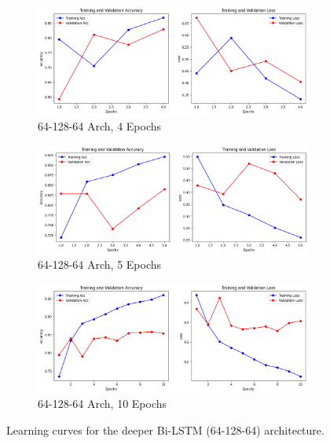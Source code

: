 \documentclass[11pt]{article}
\begin{document}
\begin{figure}[htbp]
  \centering
  \begin{subfigure}{0.3\textwidth}
    \includegraphics[width=\linewidth]{figs/4_3.png}
    \caption{64-128-64 Arch, 4 Epochs}
    \label{fig:lstm-64-128-64-4e}
  \end{subfigure}
  \hfill
  \begin{subfigure}{0.3\textwidth}
    \includegraphics[width=\linewidth]{figs/5_3.png}
    \caption{64-128-64 Arch, 5 Epochs}
    \label{fig:lstm-64-128-64-5e}
  \end{subfigure}
  \hfill
  \begin{subfigure}{0.3\textwidth}
    \includegraphics[width=\linewidth]{figs/10_3.png}
    \caption{64-128-64 Arch, 10 Epochs}
    \label{fig:lstm-64-128-64-10e}
  \end{subfigure}
 
  \caption{Learning curves for the deeper Bi-LSTM (64-128-64) architecture.}
  \label{fig:lstm-64-128-64-curves}
\end{figure}
\end{document}
